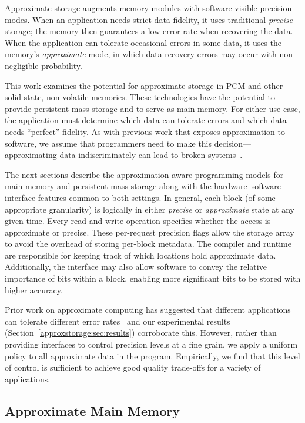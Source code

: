Approximate storage augments memory modules with software-visible
precision modes. When an application needs strict data fidelity,
it uses traditional \emph{precise} storage; the memory then
guarantees a low error rate when recovering the data. When the
application can tolerate occasional errors in some data, it uses
the memory's \emph{approximate} mode, in which data recovery errors
may occur with non-negligible probability.

This work examines the potential for approximate storage in
PCM and other solid-state, non-volatile memories.
These technologies have the potential to provide persistent mass storage
and to serve as main memory.
For either use case, the application must determine which data can
tolerate errors and which data needs ``perfect'' fidelity. As with
previous work that exposes approximation to software, we assume that
programmers need to make this decision---approximating data
indiscriminately can lead to broken systems~\cite{enerj,relax,green,truffle,npu}.

The next sections describe the approximation-aware programming
models for main memory and persistent mass storage along with
the hardware--software interface features common to both settings. 
In general,
each block (of some appropriate granularity) is logically in either
\emph{precise} or
\emph{approximate} state at any given time. Every read and write operation specifies
whether the access is approximate or precise.
These per-request precision flags allow the storage array to
avoid the overhead of storing per-block metadata. The
compiler and runtime are responsible for keeping track of which locations hold approximate
data. Additionally, the interface may also allow
software to convey the relative importance of bits within a block, enabling
more significant bits to be stored with higher accuracy.

Prior work on approximate computing has suggested that different applications
can tolerate different error rates~\cite{enerj,truffle} and our experimental
results (Section~\ref{approxstorage:sec:results}) corroborate this. However, rather than
providing interfaces to control precision levels at a fine grain, we apply a
uniform policy to all approximate data in the program.
Empirically, we find 
that this level of control is sufficient to achieve good quality trade-offs for
a variety of applications.

\subsection{Approximate Main Memory}

